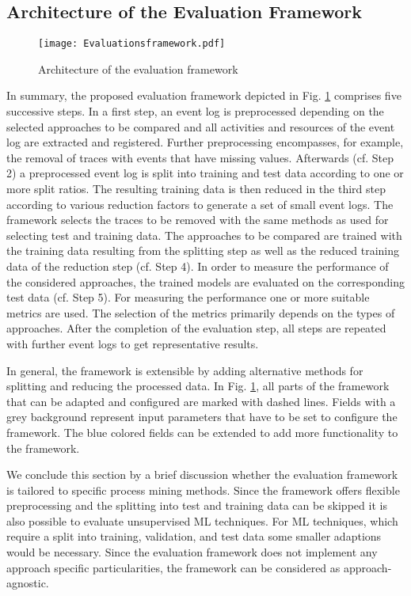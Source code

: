 \documentclass[runningheads]{llncs}
\begin{document}
\subsection{Architecture of the Evaluation Framework}
\vspace{-5pt}
\begin{figure}[t]
			\setlength{\belowcaptionskip}{-19pt}
	\centering
	\texttt{[image: Evaluationsframework.pdf]}
	\caption{Architecture of the evaluation framework}
	\label{concept}
\end{figure}
In summary, the proposed evaluation framework depicted in Fig. \ref{concept} comprises five successive steps. In a first step, an event log is preprocessed depending on the selected approaches to be compared and all activities and resources of the event log are extracted and registered. Further preprocessing encompasses, for example, the removal of traces with events that have missing values. Afterwards (cf. Step 2) a preprocessed event log is split into training and test data according to one or more split ratios. The resulting training data is then reduced in the third step according to various reduction factors to generate a set of small event logs. The framework selects the traces to be removed with the same methods as used for selecting test and training data. The approaches to be compared are trained with the training data resulting from the splitting step as well as the reduced training data of the reduction step (cf. Step 4). In order to measure the performance of the considered approaches, the trained models are evaluated on the corresponding test data (cf. Step 5). For measuring the performance one or more suitable metrics are used. The selection of the metrics primarily depends on the types of approaches. After the completion of the evaluation step, all steps are repeated with further event logs to get representative results.

In general, the framework is extensible by adding alternative methods for splitting and reducing the processed data. In Fig. \ref{concept}, all parts of the framework that can be adapted and configured are marked with dashed lines. Fields with a grey background represent input parameters that have to be set to configure the framework. The blue colored fields can be extended to add more functionality to the framework. 

We conclude this section by a brief discussion whether the evaluation framework is tailored to specific process mining methods. Since the framework offers flexible preprocessing and the splitting into test and training data can be skipped it is also possible to evaluate unsupervised ML techniques. For ML techniques, which require a split into training, validation, and test data some smaller adaptions would be necessary. Since the evaluation framework does not implement any approach specific particularities, the framework can be considered as approach-agnostic.
\vspace{-12pt}
\end{document}
